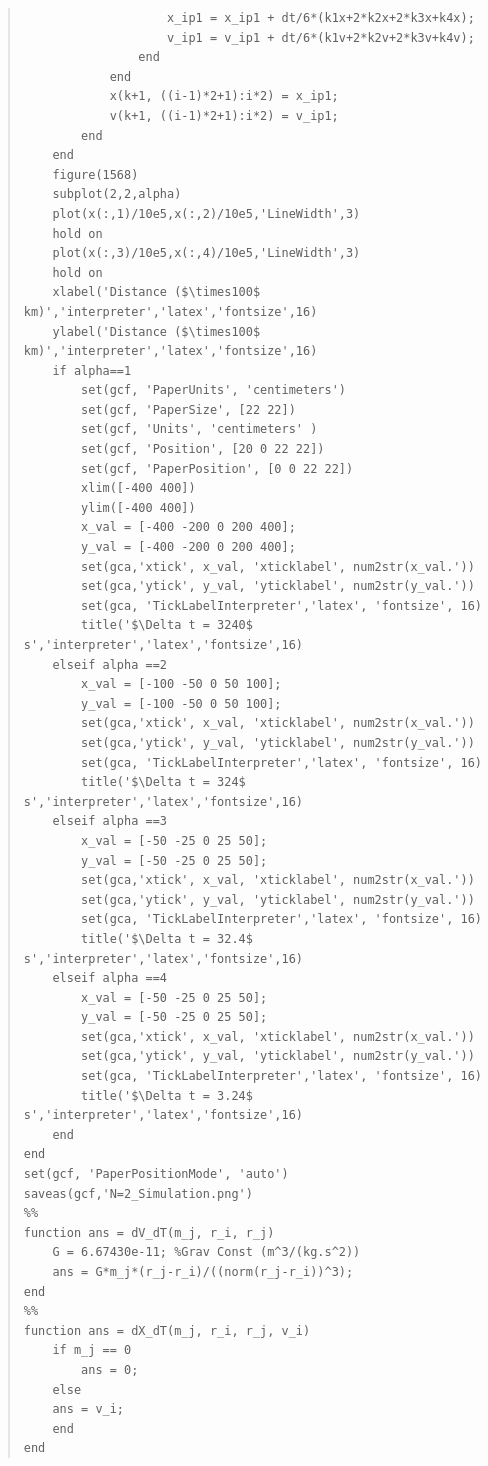 \documentclass[conf]{new-aiaa}
\begin{document}
\begin{quote}
\begin{lstlisting}
                    x_ip1 = x_ip1 + dt/6*(k1x+2*k2x+2*k3x+k4x);
                    v_ip1 = v_ip1 + dt/6*(k1v+2*k2v+2*k3v+k4v);
                end
            end
            x(k+1, ((i-1)*2+1):i*2) = x_ip1;
            v(k+1, ((i-1)*2+1):i*2) = v_ip1;
        end
    end
    figure(1568)
    subplot(2,2,alpha)
    plot(x(:,1)/10e5,x(:,2)/10e5,'LineWidth',3)
    hold on
    plot(x(:,3)/10e5,x(:,4)/10e5,'LineWidth',3)
    hold on
    xlabel('Distance ($\times100$ km)','interpreter','latex','fontsize',16)
    ylabel('Distance ($\times100$ km)','interpreter','latex','fontsize',16)
    if alpha==1
        set(gcf, 'PaperUnits', 'centimeters')
        set(gcf, 'PaperSize', [22 22])
        set(gcf, 'Units', 'centimeters' )
        set(gcf, 'Position', [20 0 22 22])
        set(gcf, 'PaperPosition', [0 0 22 22])
        xlim([-400 400])
        ylim([-400 400])
        x_val = [-400 -200 0 200 400];
        y_val = [-400 -200 0 200 400];
        set(gca,'xtick', x_val, 'xticklabel', num2str(x_val.'))
        set(gca,'ytick', y_val, 'yticklabel', num2str(y_val.'))
        set(gca, 'TickLabelInterpreter','latex', 'fontsize', 16)
        title('$\Delta t = 3240$ s','interpreter','latex','fontsize',16)
    elseif alpha ==2
        x_val = [-100 -50 0 50 100];
        y_val = [-100 -50 0 50 100];
        set(gca,'xtick', x_val, 'xticklabel', num2str(x_val.'))
        set(gca,'ytick', y_val, 'yticklabel', num2str(y_val.'))
        set(gca, 'TickLabelInterpreter','latex', 'fontsize', 16)
        title('$\Delta t = 324$ s','interpreter','latex','fontsize',16)
    elseif alpha ==3
        x_val = [-50 -25 0 25 50];
        y_val = [-50 -25 0 25 50];
        set(gca,'xtick', x_val, 'xticklabel', num2str(x_val.'))
        set(gca,'ytick', y_val, 'yticklabel', num2str(y_val.'))
        set(gca, 'TickLabelInterpreter','latex', 'fontsize', 16)
        title('$\Delta t = 32.4$ s','interpreter','latex','fontsize',16)
    elseif alpha ==4
        x_val = [-50 -25 0 25 50];
        y_val = [-50 -25 0 25 50];
        set(gca,'xtick', x_val, 'xticklabel', num2str(x_val.'))
        set(gca,'ytick', y_val, 'yticklabel', num2str(y_val.'))
        set(gca, 'TickLabelInterpreter','latex', 'fontsize', 16)
        title('$\Delta t = 3.24$ s','interpreter','latex','fontsize',16)
    end
end
set(gcf, 'PaperPositionMode', 'auto')
saveas(gcf,'N=2_Simulation.png')
%%
function ans = dV_dT(m_j, r_i, r_j)
    G = 6.67430e-11; %Grav Const (m^3/(kg.s^2))
    ans = G*m_j*(r_j-r_i)/((norm(r_j-r_i))^3);
end
%%
function ans = dX_dT(m_j, r_i, r_j, v_i)
    if m_j == 0
        ans = 0;
    else
    ans = v_i;
    end
end
    \end{lstlisting}
\end{quote}
\end{document}
